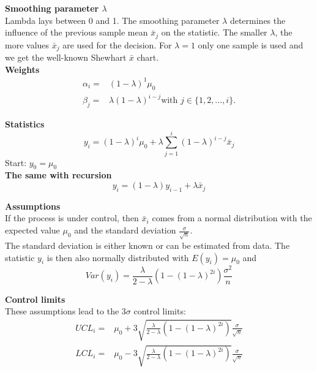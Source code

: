 \textbf{Smoothing parameter $\lambda$}\\
Lambda lays between 0 and 1. The smoothing parameter $\lambda$ determines the influence of the previous sample mean $\bar{x}_j$ on the statistic. The smaller $\lambda$, the more values $\bar{x}_j$ are used for the decision. For $\lambda = 1$ only one sample is used and we get the well-known Shewhart $\bar{x}$ chart.\\

\textbf{Weights}\\
\begin{equation}
  \begin{split}
    \alpha_i =& (1-\lambda)^1 \mu_0\\
    \beta_j =& \lambda(1-\lambda)^{i-j} \text{with } j \in \{1,2,...,i\}.
  \end{split}
\end{equation}

\textbf{Statistics}\\
\begin{equation}
  y_i = (1-\lambda)^i \mu_0 + \lambda \sum_{j=1}^i(1-\lambda)^{i-j}\bar{x}_j
\end{equation}
Start: $y_0 = \mu_0$\\

\textbf{The same with recursion}\\
\begin{equation}
  y_i = (1-\lambda)y_{i-1} + \lambda\bar{x}_j
\end{equation}

\textbf{Assumptions}\\
If the process is under control, then $\bar{x}_i$ comes from a normal distribution with the expected value $\mu_0$ and the standard deviation $\frac{\sigma}{\sqrt{n}}$.\\
The standard deviation is either known or can be estimated from data. The statistic $y_i$ is then also normally distributed with $E(y_i) = \mu_0$ and
\begin{equation}
  Var(y_i) = \frac{\lambda}{2-\lambda}(1-(1-\lambda)^{2i})\frac{\sigma^2}{n}
\end{equation}

\textbf{Control limits}\\
These assumptions lead to the $3\sigma$ control limits:
\begin{equation}
  \begin{split}
    UCL_i =& \mu_0 + 3 \sqrt{\frac{\lambda}{2-\lambda}(1-(1-\lambda)^{2i})}\frac{\sigma}{\sqrt{n}}\\
    LCL_i =& \mu_0 - 3 \sqrt{\frac{\lambda}{2-\lambda}(1-(1-\lambda)^{2i})}\frac{\sigma}{\sqrt{n}}
  \end{split}
\end{equation}

